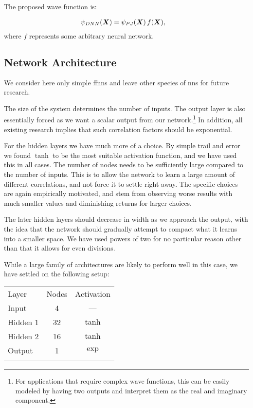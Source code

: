 \documentclass[Thesis.tex]{subfiles}
\begin{document}
The proposed wave function is:

\begin{align}\label{eq:pade-dnn}
  \psi_{DNN}(\bm{X}) &= \psi_{PJ}(\bm{X})\, f(\bm{X}),
\end{align}
where $f$ represents some arbitrary neural network.


\subsection{Network Architecture}

We consider here only simple \glspl{ffnn} and leave other species of \glspl{nn} for
future research.

The size of the system determines the number of inputs.
The output layer is also essentially forced as we want a
scalar output from our network.\footnote{For applications that require complex
  wave functions, this can be easily modeled by having two outputs and
  interpret them as the real and imaginary component.} In addition, all
existing research implies that such correlation factors should be exponential.

For the hidden layers we have much more of a choice. By simple trail and error
we found $\tanh$ to be the most suitable activation function, and we have used this
in all cases. The number of nodes needs to be sufficiently large compared to the
number of inputs. This is to allow the network to learn a large amount of
different correlations, and not force it to settle right away.
The specific choices are again empirically motivated, and stem
from observing worse results with much smaller values and diminishing returns
for larger choices.

The later hidden layers should decrease in width as we approach the output, with
the idea that the network should gradually attempt to compact what it learns
into a smaller space. We have used powers of two for no particular reason other
than that it allows for even divisions.

While a large family of architectures are likely to perform well in this case,
we have settled on the following setup:

\begin{center}
  \begin{tabular}{lcc}
    \toprule
    \addlinespace
    Layer & Nodes & Activation\\
    \addlinespace
    \midrule
    \addlinespace
    \addlinespace
    Input & 4 & ---\\
    Hidden 1& 32 & $\tanh$\\
    Hidden 2& 16 & $\tanh$\\
    Output & 1 & $\exp$\\
    \addlinespace
    \addlinespace
    \bottomrule
  \end{tabular}
\end{center}
\end{document}
